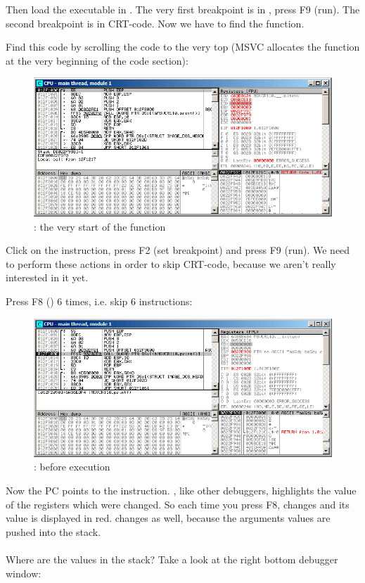 Then load the executable in \olly.
The very first breakpoint is in , press 
F9 (run).
The second breakpoint is in \ac{CRT}-code.
Now we have to find the \main function.

Find this code by scrolling the code to the very top (MSVC allocates the \main function at the very beginning of the code section): 
\begin{figure}[H]
\centering
\includegraphics[scale=\FigScale]{patterns/03_printf/x86/olly3_1.png}
\caption{\olly: the very start of the \main function}
\label{fig:printf3_olly_1}
\end{figure}

Click on the  instruction, press F2 (set breakpoint) and press F9 (run).
We need to perform these actions in order to skip \ac{CRT}-code, because we aren't really interested in it yet.

\clearpage
Press F8 (\stepover) 6 times, i.e. skip 6 instructions:

\begin{figure}[H]
\centering
\includegraphics[scale=\FigScale]{patterns/03_printf/x86/olly3_2.png}
\caption{\olly: before \printf execution}
\label{fig:printf3_olly_2}
\end{figure}

Now the \ac{PC} points to the  instruction.
\olly, like other debuggers, highlights the value of the registers which were changed.
So each time you press F8, \EIP changes and its value is displayed in red.
\ESP changes as well, because the arguments values are pushed into the stack.\\
\\
Where are the values in the stack?
Take a look at the right bottom debugger window:

